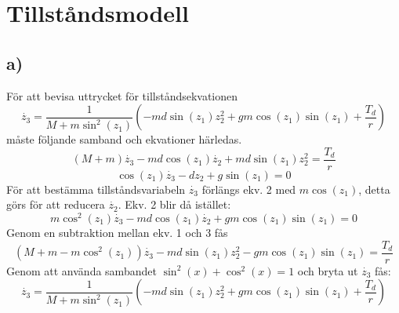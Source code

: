 \documentclass[11pt]{article}
\begin{document}

\tableofcontents
\pagestyle{empty}
\newpage
\setcounter{page}{1}
\pagestyle{fancy}

\section{Tillståndsmodell}
\subsection{a)}
För att bevisa uttrycket för tillståndsekvationen $$\dot{z_3} =\dfrac{1}{M+m\sin^2(z_1)}(-md\sin(z_1)z_2^2+gm\cos(z_1)\sin(z_1)+\dfrac{T_d}{r})$$
måste följande samband och ekvationer härledas.
\begin{equation}
(M+m)\dot{z_3}-md\cos(z_1)\dot{z_2}+md\sin(z_1)z_2^2 = \dfrac{T_d}{r}
\end{equation}
\begin{equation}
\cos(z_1)\dot{z_3}-dz_2+g\sin(z_1)=0
\end{equation}
För att bestämma tillståndsvariabeln $\dot{z_3}$ förlängs ekv. 2 med $m\cos(z_1)$, detta görs för att reducera $\dot{z_2}$. Ekv. 2 blir då istället:
\begin{equation}
m\cos^2(z_1)\dot{z_3}-md\cos(z_1)\dot{z_2}+gm\cos(z_1)\sin(z_1)=0
\end{equation}
Genom en subtraktion mellan ekv. 1 och 3 fås \begin{equation*}
(M+m-m\cos^2(z_1))\dot{z_3}-md\sin(z_1)z_2^2-gm\cos(z_1)\sin(z_1) = \dfrac{T_d}{r}
\end{equation*} Genom att använda sambandet $\sin^2(x)+\cos^2(x)=1$ och bryta ut $\dot{z_3}$ fås:
$$\dot{z_3} =\dfrac{1}{M+m\sin^2(z_1)}(-md\sin(z_1)z_2^2+gm\cos(z_1)\sin(z_1)+\dfrac{T_d}{r})$$
\newpage
\end{document}
